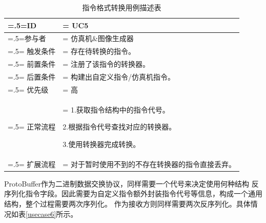 \begin{table}[htbp]
    \begin{center}
        \caption{指令格式转换用例描述表}
        \label{usecase5}
        \renewcommand\arraystretch{1.5}
        \begin{tabularx}{0.8\textwidth}{ 
            | >{\centering\arraybackslash\hsize=.5\hsize\linewidth=\hsize}X 
            | >{\raggedright\arraybackslash\hsize=1.5\hsize\linewidth=\hsize}X 
            | }
            \hline
            \textbf{ID} & \textbf{UC5}\\
            \hline
            参与者 & 仿真机\&图像生成器\\
            \hline
            触发条件 & 存在待转换的指令。\\
            \hline
            前置条件 & 注册了该指令的转换器。\\
            \hline
            后置条件 & 构建出自定义指令/仿真机指令。\\
            \hline
            优先级 & 高\\
            \hline
            正常流程 &  1.获取指令结构中的指令代号。\par 2.根据指令代号查找对应的转换器。\par 3.使用转换器完成转换。\\
            \hline
            扩展流程 & 对于暂时使用不到的不存在转换器的指令直接丢弃。\\
            \hline
        \end{tabularx}
    \end{center}
\end{table}
\par
ProtoBuffer作为二进制数据交换协议，同样需要一个代号来决定使用何种结构
反序列化指令字段。因此需要为自定义指令额外封装指令代号等信息，构成一个通用结构，整个过程需要两次序列化。
作为接收方则同样需要两次反序列化。具体情况如表\ref{usecase6}所示。
